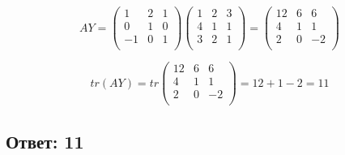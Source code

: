 \documentclass[a4paper]{article}
\begin{document}
\begin{equation*}
AY = 
\begin{pmatrix}
1 &2&1\\
0&1&0\\
-1&0&1\\
\end{pmatrix}  
\begin{pmatrix}
1 &2&3\\
4&1&1\\
3&2&1\\
\end{pmatrix} = 
\begin{pmatrix}
12 &6&6\\
4&1&1\\
2&0&-2\\
\end{pmatrix}   
\end{equation*}

\begin{equation*}
tr(AY) = tr
\begin{pmatrix}
12 &6&6\\
4&1&1\\
2&0&-2\\
\end{pmatrix}   = 12 +1 -2 = 11
\end{equation*}
\subsection*{Ответ: 11}





\newpage
\newpage
\newpage
\newpage






 
\end{document}
